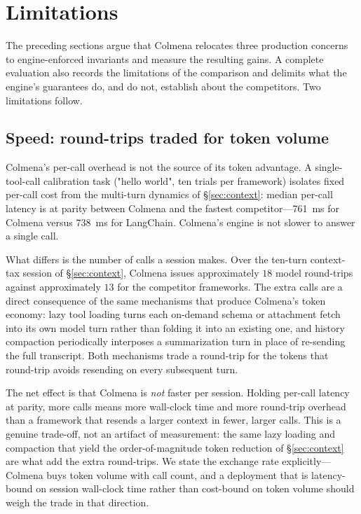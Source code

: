 \section{Limitations}
\label{sec:limitations}

The preceding sections argue that Colmena relocates three production
concerns to engine-enforced invariants and measure the resulting gains.
A complete evaluation also records the limitations of the comparison and
delimits what the engine's guarantees do, and do not, establish about the
competitors. Two limitations follow.

\subsection{Speed: round-trips traded for token volume}
\label{subsec:limitations-speed}

Colmena's per-call overhead is not the source of its token advantage. A
single-tool-call calibration task ("hello world", ten trials per
framework) isolates fixed per-call cost from the multi-turn dynamics of
\S\ref{sec:context}: median per-call latency is at parity between Colmena
and the fastest competitor---\SI{761}{ms} for Colmena versus \SI{738}{ms}
for LangChain. Colmena's engine is not slower to answer a single call.

What differs is the number of calls a session makes. Over the ten-turn
context-tax session of \S\ref{sec:context}, Colmena issues approximately
$18$ model round-trips against approximately $13$ for the competitor
frameworks. The extra calls are a direct consequence of the same
mechanisms that produce Colmena's token economy: lazy tool loading turns
each on-demand schema or attachment fetch into its own model turn rather
than folding it into an existing one, and history compaction periodically
interposes a summarization turn in place of re-sending the full transcript.
Both mechanisms trade a round-trip for the tokens that round-trip avoids
resending on every subsequent turn.

The net effect is that Colmena is \emph{not} faster per session. Holding
per-call latency at parity, more calls means more wall-clock time and more
round-trip overhead than a framework that resends a larger context in
fewer, larger calls. This is a genuine trade-off, not an artifact of
measurement: the same lazy loading and compaction that yield the
order-of-magnitude token reduction of \S\ref{sec:context} are what add the
extra round-trips. We state the exchange rate explicitly---
Colmena buys token volume with call count, and a deployment that is
latency-bound on session wall-clock time rather than cost-bound on token
volume should weigh the trade in that direction.

